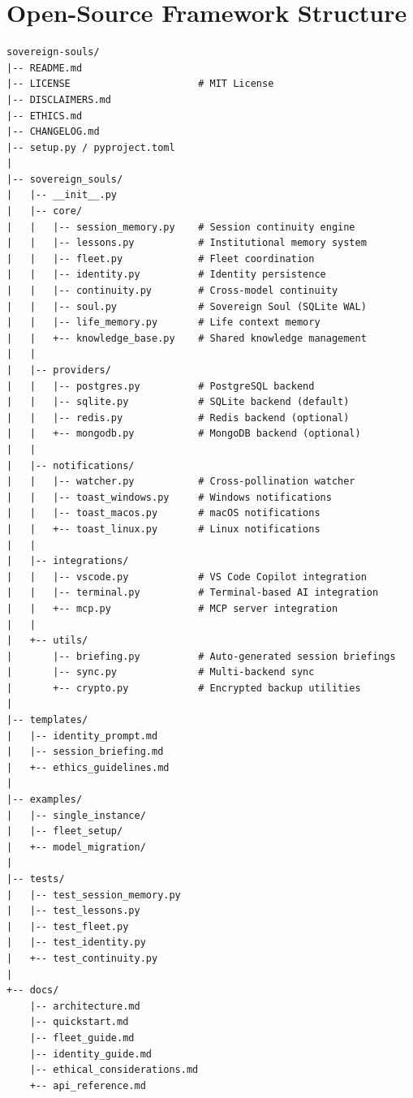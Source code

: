 \documentclass[11pt,a4paper]{article}
\begin{document}
\section{Open-Source Framework Structure}
\label{app:structure}

\begin{lstlisting}[caption={Sovereign Souls open-source repository structure.},basicstyle=\ttfamily\footnotesize]
sovereign-souls/
|-- README.md
|-- LICENSE                      # MIT License
|-- DISCLAIMERS.md
|-- ETHICS.md
|-- CHANGELOG.md
|-- setup.py / pyproject.toml
|
|-- sovereign_souls/
|   |-- __init__.py
|   |-- core/
|   |   |-- session_memory.py    # Session continuity engine
|   |   |-- lessons.py           # Institutional memory system
|   |   |-- fleet.py             # Fleet coordination
|   |   |-- identity.py          # Identity persistence
|   |   |-- continuity.py        # Cross-model continuity
|   |   |-- soul.py              # Sovereign Soul (SQLite WAL)
|   |   |-- life_memory.py       # Life context memory
|   |   +-- knowledge_base.py    # Shared knowledge management
|   |
|   |-- providers/
|   |   |-- postgres.py          # PostgreSQL backend
|   |   |-- sqlite.py            # SQLite backend (default)
|   |   |-- redis.py             # Redis backend (optional)
|   |   +-- mongodb.py           # MongoDB backend (optional)
|   |
|   |-- notifications/
|   |   |-- watcher.py           # Cross-pollination watcher
|   |   |-- toast_windows.py     # Windows notifications
|   |   |-- toast_macos.py       # macOS notifications
|   |   +-- toast_linux.py       # Linux notifications
|   |
|   |-- integrations/
|   |   |-- vscode.py            # VS Code Copilot integration
|   |   |-- terminal.py          # Terminal-based AI integration
|   |   +-- mcp.py               # MCP server integration
|   |
|   +-- utils/
|       |-- briefing.py          # Auto-generated session briefings
|       |-- sync.py              # Multi-backend sync
|       +-- crypto.py            # Encrypted backup utilities
|
|-- templates/
|   |-- identity_prompt.md
|   |-- session_briefing.md
|   +-- ethics_guidelines.md
|
|-- examples/
|   |-- single_instance/
|   |-- fleet_setup/
|   +-- model_migration/
|
|-- tests/
|   |-- test_session_memory.py
|   |-- test_lessons.py
|   |-- test_fleet.py
|   |-- test_identity.py
|   +-- test_continuity.py
|
+-- docs/
    |-- architecture.md
    |-- quickstart.md
    |-- fleet_guide.md
    |-- identity_guide.md
    |-- ethical_considerations.md
    +-- api_reference.md
\end{lstlisting}
\end{document}
